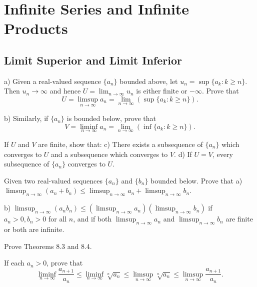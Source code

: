 \chapter{Infinite Series and Infinite Products}

\section{Limit Superior and Limit Inferior}

\begin{problembox}
    a) Given a real-valued sequence \(\{a_n\}\) bounded above, let \(u_n = \sup \{a_k : k \geq n\}\). Then \(u_n \to \infty\) and hence \(U = \lim_{n \to \infty} u_n\) is either finite or \(-\infty\). Prove that
    \[U = \limsup_{n \to \infty} a_n = \lim_{n \to \infty} (\sup \{a_k : k \geq n\}).\]
    
    b) Similarly, if \(\{a_n\}\) is bounded below, prove that
    \[V = \liminf_{n \to \infty} a_n = \lim_{n \to \infty} (\inf \{a_k : k \geq n\}).\]
    
    If \( U \) and \( V \) are finite, show that:
    c) There exists a subsequence of \(\{a_n\}\) which converges to \( U \) and a subsequence which converges to \( V \).
    d) If \( U = V \), every subsequence of \(\{a_n\}\) converges to \( U \).
    \end{problembox}
    
    \begin{problembox}
    Given two real-valued sequences \(\{a_n\}\) and \(\{b_n\}\) bounded below. Prove that
    a) \(\limsup_{n \to \infty} (a_n + b_n) \leq \limsup_{n \to \infty} a_n + \limsup_{n \to \infty} b_n\).
    
    b) \(\limsup_{n \to \infty} (a_n b_n) \leq (\limsup_{n \to \infty} a_n)(\limsup_{n \to \infty} b_n)\) if \(a_n > 0, b_n > 0\) for all \(n\), and if both \(\limsup_{n \to \infty} a_n\) and \(\limsup_{n \to \infty} b_n\) are finite or both are infinite.
    \end{problembox}
    
    \begin{problembox}
    Prove Theorems 8.3 and 8.4.
    \end{problembox}
    
    \begin{problembox}
    If each \(a_n > 0\), prove that
    \[\liminf_{n \to \infty} \frac{a_{n+1}}{a_n} \leq \liminf_{n \to \infty} \sqrt[n]{a_n} \leq \limsup_{n \to \infty} \sqrt[n]{a_n} \leq \limsup_{n \to \infty} \frac{a_{n+1}}{a_n}.\]
    \end{problembox}
    
